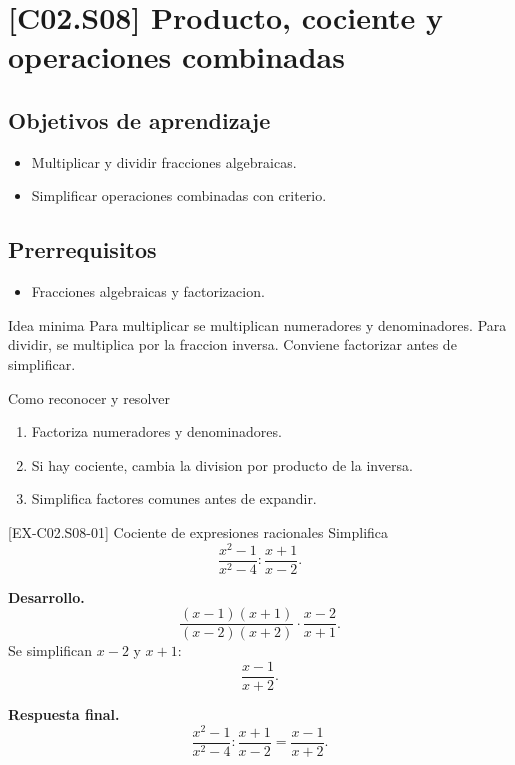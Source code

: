\section{[C02.S08] Producto, cociente y operaciones combinadas}

\subsection*{Objetivos de aprendizaje}
\begin{itemize}
  \item Multiplicar y dividir fracciones algebraicas.
  \item Simplificar operaciones combinadas con criterio.
\end{itemize}

\subsection*{Prerrequisitos}
\begin{itemize}
  \item Fracciones algebraicas y factorizacion.
\end{itemize}

\begin{theorybox}{Idea minima}
Para multiplicar se multiplican numeradores y denominadores. Para dividir, se multiplica por la
fraccion inversa. Conviene factorizar antes de simplificar.
\end{theorybox}

\begin{methodbox}{Como reconocer y resolver}
\begin{enumerate}
  \item Factoriza numeradores y denominadores.
  \item Si hay cociente, cambia la division por producto de la inversa.
  \item Simplifica factores comunes antes de expandir.
\end{enumerate}
\end{methodbox}

\begin{solvedexample}{[EX-C02.S08-01] Cociente de expresiones racionales}
Simplifica
\[
\frac{x^2-1}{x^2-4}:\frac{x+1}{x-2}.
\]

\textbf{Desarrollo.}
\[
\frac{(x-1)(x+1)}{(x-2)(x+2)}\cdot \frac{x-2}{x+1}.
\]
Se simplifican \(x-2\) y \(x+1\):
\[
\frac{x-1}{x+2}.
\]

\textbf{Respuesta final.}
\[
\frac{x^2-1}{x^2-4}:\frac{x+1}{x-2}=\frac{x-1}{x+2}.
\]
\end{solvedexample}

